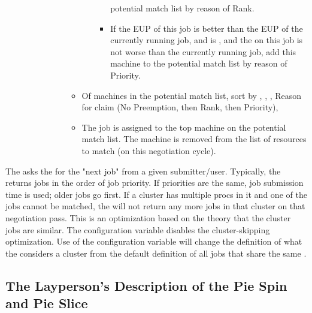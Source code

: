 \begin{enumerate}
\begin{description}
\begin{description}
\begin{itemize}
\begin{enumerate}
\begin{itemize}
		    potential match list by reason of Rank.
		    \item  If the EUP of this job is better than the EUP
		    of the currently running job, and
		     is ,
		    and the  on this job is not worse
		    than the currently running job, add this machine to the
		    potential match list by reason of Priority.
                    \end{itemize}
                  \end{enumerate}
	        \item Of machines in the potential match list, sort by
		, ,
		, Reason for claim
		(No Preemption, then Rank, then Priority),
	        \item The job is assigned to the top machine on the
		potential match list.  The machine is removed
		from the list of resources to match
		(on this negotiation cycle).
              \end{itemize}
          \end{description}
    \end{description}
\end{enumerate}

The  asks the  for the 
"next job" from a given submitter/user.
Typically, the  returns jobs in the order of
job priority.
If priorities are the same,
job submission time is used; older jobs go first.
If a cluster has multiple procs in it and one of the jobs cannot be matched,
the  will not return any more jobs in that cluster
on that negotiation pass.
This is an optimization based on the theory that the cluster jobs are similar.
The configuration variable 
disables the cluster-skipping optimization.
Use of the configuration variable 
will change the
definition of what the  considers a cluster from the
default definition of all jobs that share the same .

\subsection{\label{sec:PieSlice}The Layperson's Description of the Pie Spin and Pie Slice}

